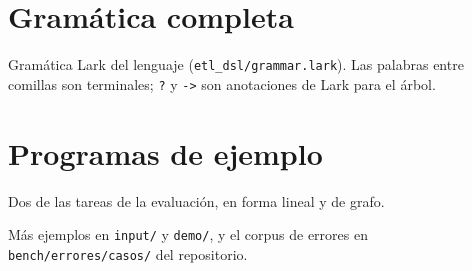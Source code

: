 \documentclass[sigplan,screen,nonacm]{acmart}
\begin{document}
\clearpage



\clearpage
\appendix

\section{Gramática completa}
\label{ap:gramatica}
Gramática Lark del lenguaje (\texttt{etl\_dsl/grammar.lark}). Las palabras entre comillas son
terminales; \texttt{?} y \texttt{->} son anotaciones de Lark para el árbol.


\section{Programas de ejemplo}
\label{ap:ejemplos}
Dos de las tareas de la evaluación, en forma lineal y de grafo.


Más ejemplos en \texttt{input/} y \texttt{demo/}, y el corpus de errores en
\texttt{bench/errores/casos/} del repositorio.
\end{document}
